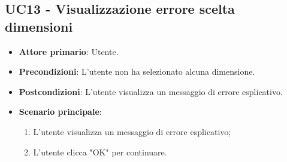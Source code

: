 \subsection{UC13 - Visualizzazione errore scelta dimensioni}
\begin{itemize}
	\item \textbf{Attore primario}: Utente.
	\item \textbf{Precondizioni}: L'utente non ha selezionato alcuna dimensione.
	\item \textbf{Postcondizioni}: L'utente visualizza un messaggio di errore esplicativo.
	\item \textbf{Scenario principale}:
		\begin{enumerate}
			\item L'utente visualizza un messaggio di errore esplicativo;
			\item L'utente clicca "OK" per continuare.
		\end{enumerate}
\end{itemize}